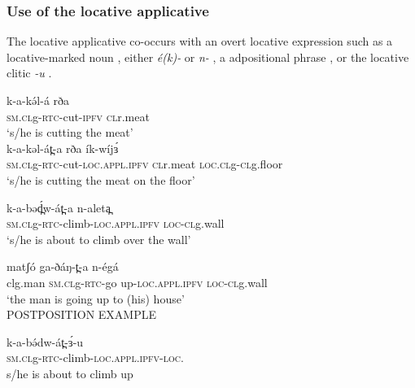 



\subsubsection{Use of the locative applicative}\label{sec:ch11:locappluse}

The locative applicative co-occurs with an overt locative expression such as a locative-marked noun , either \textit{é(k)-}  or \textit{n-} , a adpositional phrase , or  the locative clitic \textit{-u} .

\ea
\ea 	\gll k-a-kə́l-á 		rða  \\
\textsc{sm.cl}g-\textsc{rtc}-cut-\textsc{ipfv}	\textsc{cl}r.meat		\\
\trans ‘s/he is cutting the meat’\\

\ex 	\gll k-a-kəl-át̪-a 				rða 		ík-wíjɜ́\\
	\textsc{sm.cl}g-\textsc{rtc}-cut-\textsc{loc.appl.ipfv}		\textsc{cl}r.meat	\textsc{loc.cl}g-\textsc{cl}g.floor\\
	\trans ‘s/he is cutting the meat on the floor’\\ \label{ex:ch11:loce}

\ex 	\gll k-a-bəd̪́w-át̪-a 				n-aleta̪  \\
	\textsc{sm.cl}g-\textsc{rtc}-climb-\textsc{loc.appl.ipfv}	\textsc{loc-cl}g.wall\\
	\trans ‘s/he is about to climb over the wall’\\ \label{ex:ch11:locn}

\ex	\gll matʃó 	ga-ðáŋ-t̪-a 				n-égá\\
clg.man		\textsc{sm.cl}g-\textsc{rtc}-go up-\textsc{loc.appl.ipfv}	\textsc{loc-cl}g.wall\\
		\trans ‘the man is going up to (his) house’\\

\ex	POSTPOSITION EXAMPLE\\\label{ex:ch11:locad} %

\ex 	\gll k-a-bə́dw-át̪-ɜ́-u  \\
	\textsc{sm.cl}g-\textsc{rtc}-climb-\textsc{loc.appl.ipfv-loc}.\\
	\trans s/he is about to climb up \\ \label{ex:ch11:locu}
\z
\z

